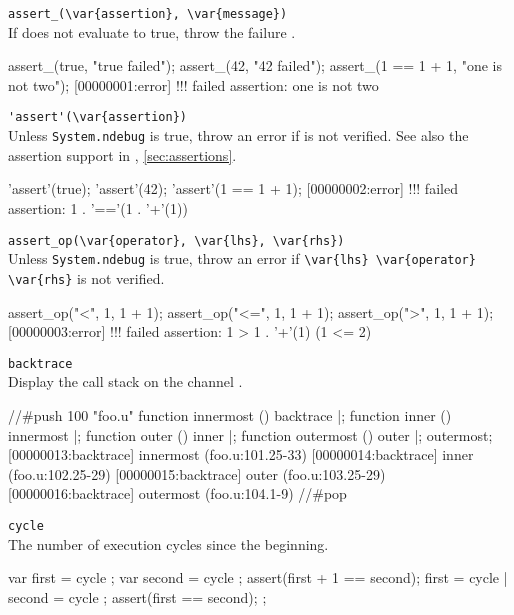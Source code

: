 \begin{urbiscriptapi}
\item \lstinline|assert_(\var{assertion}, \var{message})|\\
  If  does not evaluate to true, throw the failure
  .
\begin{urbiscript}
assert_(true,       "true failed");
assert_(42,         "42 failed");
assert_(1 == 1 + 1, "one is not two");
[00000001:error] !!! failed assertion: one is not two
\end{urbiscript}

\item \lstinline|'assert'(\var{assertion})|\\
  Unless \lstinline|System.ndebug| is true, throw an error if
   is not verified.  See also the assertion support in
  \us, \autoref{sec:assertions}.
\begin{urbiscript}
'assert'(true);
'assert'(42);
'assert'(1 == 1 + 1);
[00000002:error] !!! failed assertion: 1 . '=='(1 . '+'(1))
\end{urbiscript}

\item \lstinline|assert_op(\var{operator}, \var{lhs}, \var{rhs})|\\
  Unless \lstinline|System.ndebug| is true, throw an error if
  \lstinline|\var{lhs} \var{operator} \var{rhs}| is not verified.
\begin{urbiscript}
assert_op("<",  1, 1 + 1);
assert_op("<=", 1, 1 + 1);
assert_op(">",  1, 1 + 1);
[00000003:error] !!! failed assertion: 1 > 1 . '+'(1) (1 <= 2)
\end{urbiscript}

\item \lstinline|backtrace|\experimental\\
  Display the call stack on the channel .
\begin{urbiscript}
//#push 100 "foo.u"
function innermost () { backtrace }|;
function inner ()     { innermost }|;
function outer ()     { inner }|;
function outermost () { outer }|;
outermost;
[00000013:backtrace] innermost (foo.u:101.25-33)
[00000014:backtrace] inner (foo.u:102.25-29)
[00000015:backtrace] outer (foo.u:103.25-29)
[00000016:backtrace] outermost (foo.u:104.1-9)
//#pop
\end{urbiscript}

\item \lstinline|cycle|\experimental\\
  The number of execution cycles since the beginning.
\begin{urbiscript}
{
  var first = cycle ; var second = cycle ;
  assert(first + 1 == second);
  first = cycle | second = cycle ;
  assert(first == second);
};
\end{urbiscript}


\end{urbiscriptapi}
